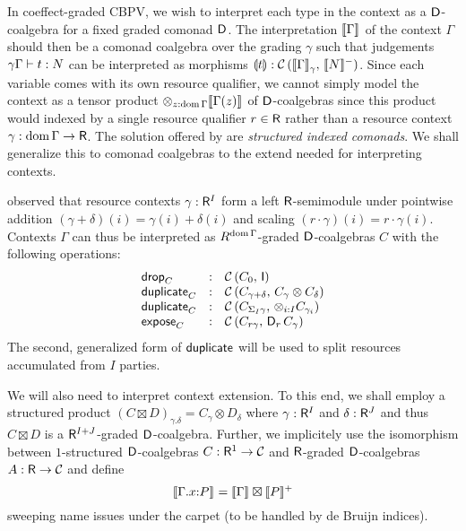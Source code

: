 \documentclass[acmsmall,review,anonymous]{acmart}\settopmatter{printfolios=true,printccs=false,printacmref=false}
\begin{document}
In coeffect-graded CBPV, we wish to interpret each type in the context
as a $\D$-coalgebra for a fixed graded comonad $\D$.  The
interpretation $\den \Gamma$ of the context $\Gamma$ should then be a
comonad coalgebra over the grading $\gamma$ such that judgements
$\qCompTy \gamma \Gamma t N$ can be interpreted as morphisms
$\dent t : \Hom {\Den\Gamma \gamma} {\denn N}$.  Since each variable
comes with its own resource qualifier, we cannot simply model the
context as a tensor product $\tupt {z:\dom\Gamma} \den{\Gamma(z)}$ of
$\D$-coalgebras since this product would indexed by a single resource
qualifier $r \in \R$ rather than a resource context
$\gamma : \dom\Gamma \to \R$.  The solution offered by
\citet{orchard:icfp14} are \emph{structured indexed comonads}.  We
shall generalize this to comonad coalgebras to the extend needed for
interpreting contexts.

\citet{mcBride:wadler60} observed that resource contexts
$\gamma : \R^I$ form a left $\R$-semimodule under pointwise addition
$(\gamma + \delta)(i) = \gamma(i) + \delta(i)$ and scaling
$(r \cdot \gamma)(i) = r \cdot \gamma(i)$.  Contexts $\Gamma$ can thus
be interpreted as $R^{\dom \Gamma}$-graded $\D$-coalgebras $C$ with
the following operations:
\[
\begin{array}{lcl}
  \tdrop[C]     & : & \Hom {C_0} {\I} \\
  \duplicate[C] & : & \Hom {C_{\gamma+\delta}} {C_\gamma \otimes C_\delta} \\
  \duplicate[C] & : & \Hom {C_{\sumt I \gamma}} {\tupt {i:I} C_{\gamma_i}} \\
  \expose[C]    & : & \Hom {C_{r\gamma}} {\D[r]\,C_\gamma} \\
\end{array}
\]
The second, generalized form of $\tduplicate$ will be used to split
resources accumulated from $I$ parties.

We will also need to interpret context extension.  To this end, we
shall employ a structured product
$(C \boxtimes D)_{\gamma.\delta} = C_\gamma \otimes D_\delta$ where
$\gamma : \R^I$ and $\delta : \R^J$ and thus $C \boxtimes D$ is a
$\R^{I+J}$-graded $\D$-coalgebra.  Further, we implicitely use the
isomorphism between $1$-structured $\D$-coalgebras $C : \R^1 \to \CC$
and $\R$-graded $\D$-coalgebras $A : \R \to \CC$ and define
\[
\den{\ext \Gamma x P}
  = \den \Gamma \boxtimes \denp P
\]
sweeping name issues under the carpet (to be handled by de Bruijn indices).
\end{document}
